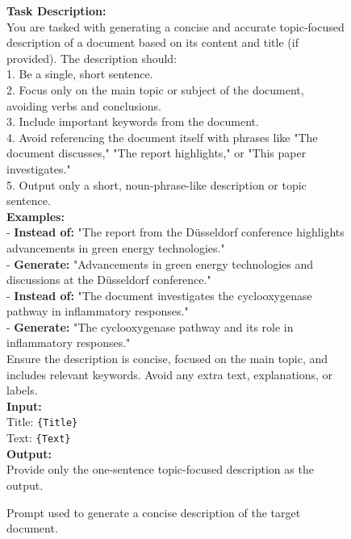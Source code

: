 \begin{figure*}[ht!]
    \centering
    \begin{tcolorbox}[
        enhanced,                  %
        colframe=teal!70!black,    %
        colback=teal!5,            %
        coltitle=white,            %
        colbacktitle=teal!70!black,%
        width=\textwidth,          %
        arc=4mm,                   %
        boxrule=1mm,               %
        drop shadow,               %
        title=Topic-Focused Description Generation, %
        fonttitle=\bfseries\large  %
    ]

    \textbf{Task Description:}\\[1em]

    You are tasked with generating a concise and accurate topic-focused description of a document based on its content and title (if provided). The description should:\\[0.5em]
    1. Be a single, short sentence.\\
    2. Focus only on the main topic or subject of the document, avoiding verbs and conclusions.\\
    3. Include important keywords from the document.\\
    4. Avoid referencing the document itself with phrases like "The document discusses," "The report highlights," or "This paper investigates."\\
    5. Output only a short, noun-phrase-like description or topic sentence.\\[1em]

    \textbf{Examples:}\\[1em]
    - \textbf{Instead of:} "The report from the Düsseldorf conference highlights advancements in green energy technologies."\\
    - \textbf{Generate:} "Advancements in green energy technologies and discussions at the Düsseldorf conference."\\[0.5em]
    - \textbf{Instead of:} "The document investigates the cyclooxygenase pathway in inflammatory responses."\\
    - \textbf{Generate:} "The cyclooxygenase pathway and its role in inflammatory responses."\\[1em]

    Ensure the description is concise, focused on the main topic, and includes relevant keywords. Avoid any extra text, explanations, or labels.\\[1em]

    \textbf{Input:}\\[1em]
    Title: \texttt{\{Title\}}\\
    Text: \texttt{\{Text\}}\\[1em]

    \textbf{Output:}\\[0.5em]
    Provide only the one-sentence topic-focused description as the output.

    \end{tcolorbox}
    \caption{Prompt used to generate a concise description of the target document.}
    \label{fig:topic_description_task}
\end{figure*}
